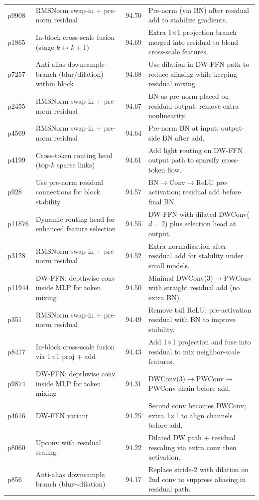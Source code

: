 \documentclass[11pt]{article}
\begin{document}
\begin{table}[htbp]
{\begin{tabular}{l p{5.2cm} c p{7.5cm}}
p9908 & RMSNorm swap-in + pre-norm residual & 94.70 & Pre-norm (via BN) after residual add to stabilize gradients. \\
p1865 & In-block cross-scale fusion (stage $k\leftrightarrow k{\pm}1$) & 94.69 & Extra 1$\times$1 projection branch merged into residual to blend cross-scale features. \\
p7257 & Anti-alias downsample branch (blur/dilation) within block & 94.68 & Use dilation in DW-FFN path to reduce aliasing while keeping residual mixing. \\
p2455 & RMSNorm swap-in + pre-norm residual & 94.67 & BN-as-pre-norm placed on residual output; remove extra nonlinearity. \\
p4569 & RMSNorm swap-in + pre-norm residual & 94.64 & Pre-norm BN at input; output-side BN after add. \\
p4199 & Cross-token routing head (top-$k$ sparse links) & 94.61 & Add light routing on DW-FFN output path to sparsify cross-token flow. \\
p928 & Use pre-norm residual connections for block stability & 94.57 & BN$\rightarrow$Conv$\rightarrow$ReLU pre-activation; residual add before final BN. \\
p11876 & Dynamic routing head for enhanced feature selection & 94.55 & DW-FFN with dilated DWConv($d{=}2$) plus selection head at output. \\
p3128 & RMSNorm swap-in + pre-norm residual & 94.52 & Extra normalization after residual add for stability under small models. \\
p11944 & DW-FFN: depthwise conv inside MLP for token mixing & 94.50 & Minimal DWConv($3$)$\rightarrow$PWConv with straight residual add (no extra BN). \\
p351 & RMSNorm swap-in + pre-norm residual & 94.49 & Remove tail ReLU; pre-activation residual with BN to improve stability. \\
p8417 & In-block cross-scale fusion via 1$\times$1 proj + add & 94.43 & Add 1$\times$1 projection and fuse into residual to mix neighbor-scale features. \\
p9874 & DW-FFN: depthwise conv inside MLP for token mixing & 94.31 & DWConv($3$)$\rightarrow$PWConv$\rightarrow$PWConv chain before add. \\
p4616 & DW-FFN variant & 94.25 & Second conv becomes DWConv; extra 1$\times$1 to align channels before add. \\
p8060 & Upconv with residual scaling & 94.22 & Dilated DW path + residual rescaling via extra conv then activation. \\
p856 & Anti-alias downsample branch (blur$\sim$dilation) & 94.17 & Replace stride-2 with dilation on 2nd conv to suppress aliasing in residual path. \\
\bottomrule
\end{tabular}
}
\end{table}
\end{document}
